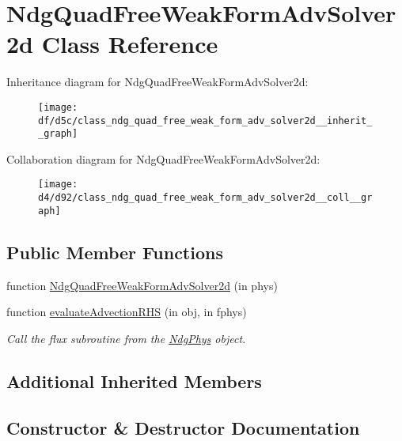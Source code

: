 \hypertarget{class_ndg_quad_free_weak_form_adv_solver2d}{}\section{Ndg\+Quad\+Free\+Weak\+Form\+Adv\+Solver2d Class Reference}
\label{class_ndg_quad_free_weak_form_adv_solver2d}


Inheritance diagram for Ndg\+Quad\+Free\+Weak\+Form\+Adv\+Solver2d\+:
\nopagebreak
\begin{figure}[H]
\begin{center}
\leavevmode
\texttt{[image: df/d5c/class\_ndg\_quad\_free\_weak\_form\_adv\_solver2d\_\_inherit\_\_graph]}
\end{center}
\end{figure}


Collaboration diagram for Ndg\+Quad\+Free\+Weak\+Form\+Adv\+Solver2d\+:
\nopagebreak
\begin{figure}[H]
\begin{center}
\leavevmode
\texttt{[image: d4/d92/class\_ndg\_quad\_free\_weak\_form\_adv\_solver2d\_\_coll\_\_graph]}
\end{center}
\end{figure}
\subsection*{Public Member Functions}
\begin{DoxyCompactItemize}
\item 
function \hyperlink{class_ndg_quad_free_weak_form_adv_solver2d_abd21fa164a5d0d79df864789215b831f}{Ndg\+Quad\+Free\+Weak\+Form\+Adv\+Solver2d} (in phys)
\item 
function \hyperlink{class_ndg_quad_free_weak_form_adv_solver2d_a9b0869fc1b44fcf52c2c6848038b3f57}{evaluate\+Advection\+R\+HS} (in obj, in fphys)
\begin{DoxyCompactList}\small\item\em Call the flux subroutine from the \hyperlink{class_ndg_phys}{Ndg\+Phys} object. \end{DoxyCompactList}\end{DoxyCompactItemize}
\subsection*{Additional Inherited Members}


\subsection{Constructor \& Destructor Documentation}
\mbox{\label{class_ndg_quad_free_weak_form_adv_solver2d_abd21fa164a5d0d79df864789215b831f}} 
